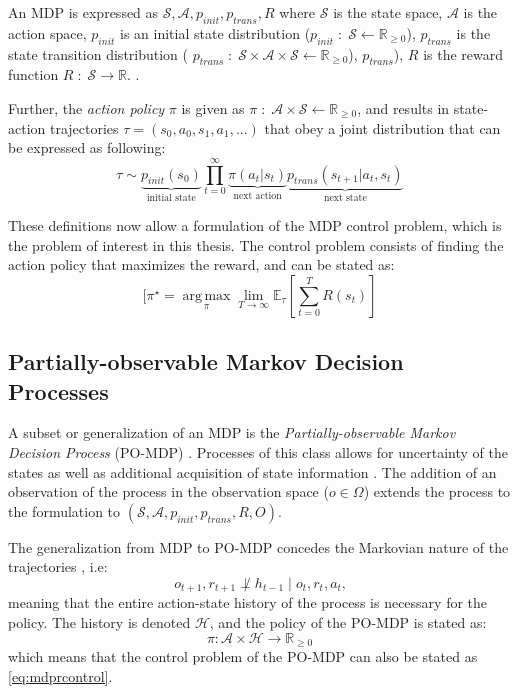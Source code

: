 An \gls{MDP} is expressed as $ \mathcal{S}, \mathcal{A}, p_{init}, p_{trans}, R$ 
where $ \mathcal{S}$ is the state space, 
$\mathcal{A}$ is the action space, 
$p_{init}$ is an initial state distribution ($p_{init}\;:\;\mathcal{S}\leftarrow \mathbb{R}_{\geq 0}$), 
$p_{trans}$ is the state transition distribution (
$p_{trans}\; : \; \mathcal{S}
\times \mathcal{A}\times \mathcal{S}
\leftarrow \mathbb{R}_{\geq 0}$), 
$p_{trans}$), $R$ is the reward function $R\;:\;\mathcal{S} \rightarrow \mathbb{R}$. \cite{prouvost2020ecole}. 

Further, the \textit{action policy} $\pi$ is given as $\pi \; : \; \mathcal{A}\times \mathcal{S}
\leftarrow \mathbb{R}_{\geq 0}$, and results in state-action trajectories $\tau = (s_0, a_0, s_1, a_1, ... )$ that obey a joint distribution that can be expressed as following: \cite{prouvost2020ecole}
\begin{equation}
    \tau \sim \underbrace{p_\textit{init}(s_0)}_{\text{initial state}}
\prod_{t=0}^\infty \underbrace{\pi(a_t | s_t)}_{\text{next action}}
\underbrace{p_\textit{trans}(s_{t+1} | a_t, s_t)}_{\text{next state}}
\end{equation}

These definitions now allow a formulation of the \gls{MDP} control problem, which is the problem of interest in this thesis. The control problem consists of finding the action policy that maximizes the reward, and can be stated as: \cite{prouvost2020ecole}
\begin{equation}\label{eq:mdprcontrol}
    [\pi^\star = \underset{\pi}{\operatorname{arg\,max}}
\lim_{T \to \infty} \mathbb{E}_\tau\left[\sum_{t=0}^{T} R(s_t)\right]
\end{equation}


\subsection{Partially-observable Markov Decision Processes}

A subset or generalization of an \gls{MDP} is the \textit{Partially-observable Markov Decision Process }(\gls{PO-MDP}) \cite{monahan1982state}. Processes of this class allows for uncertainty of the states as well as additional acquisition of state information \cite{monahan1982state}.
The addition of an observation of the process in the observation space ($o \in \Omega $) extends the process to the formulation to $ (\mathcal{S}, \mathcal{A}, p_{init}, p_{trans}, R, O)$. 

The generalization from \gls{MDP} to \gls{PO-MDP} concedes the Markovian nature of the trajectories \cite{prouvost2020ecole}, i.e:
\begin{equation}
    o_{t+1},r_{t+1} \not \perp   h_{t-1} \mid o_t,r_t,a_t
\text{,}
\end{equation}
meaning that the entire action-state history of the process is necessary for the policy. The history is denoted $\mathcal{H}$, and the policy of the \gls{PO-MDP} is stated as:
\begin{equation}
    \pi:\mathcal{A} \times \mathcal{H} \to \mathbb{R}_{\geq 0}
\end{equation}
which means that the control problem of the \gls{PO-MDP} can also be stated as \cref{eq:mdprcontrol}.

